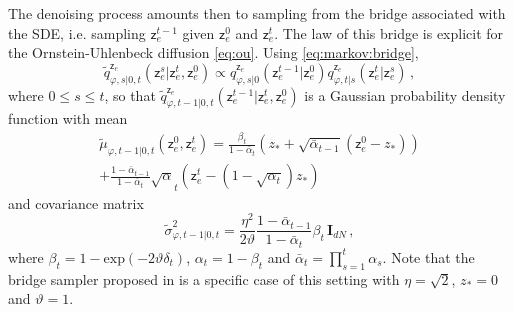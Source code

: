 \documentclass[nohyperref]{article}
\theoremstyle{plain}
\theoremstyle{definition}
\theoremstyle{remark}
\newcommand{\latentcont}{\mathsf{z}_e}
\newcommand{\bckw}{\tilde{q}}
\begin{document}
The denoising process amounts then to sampling from the bridge associated with the SDE, i.e. sampling $\latentcont^{t-1}$ given $\latentcont^0$ and $\latentcont^t$. The law of this bridge is explicit for the Ornstein-Uhlenbeck diffusion \eqref{eq:ou}.
Using \eqref{eq:markov:bridge},
$$
\bckw^{\latentcont}_{\varphi,s|0,t}(\latentcont^{s}|\latentcont^{t},\latentcont^{0}) \propto q^{\latentcont}_{\varphi,s|0}(\latentcont^{t-1}|\latentcont^{0}) q^{\latentcont}_{\varphi,t|s}(\latentcont^{t}|\latentcont^{s})\,,
$$
where $0\leqslant s\leqslant t$, so that $\bckw^{\latentcont}_{\varphi,t-1|0,t}(\latentcont^{t-1}|\latentcont^{t},\latentcont^{0})$ is a Gaussian probability density function with mean
\begin{multline*}
 \tilde \mu_{\varphi,t-1|0,t}(\latentcont^0,\latentcont^t) = \frac{\beta_t}{1-\bar{\alpha}_t}\left(z_* + \sqrt{\bar{\alpha}_{t-1}}(\latentcont^0-z_*)\right)\\  + \frac{1-\bar{\alpha}_{t-1}}{1-\bar{\alpha}_t}\sqrt{\alpha}_t\left(\latentcont^t - (1 - \sqrt{\alpha_t} )z_*\right)
 \end{multline*}
 and covariance matrix
 $$
 \tilde \sigma^2_{\varphi,t-1|0,t} = \frac{\eta^2}{2\vartheta}\frac{1- \bar \alpha_{t-1}}{1- \bar \alpha_{t}}\beta_t\, \mathbf{I}_{dN}\,,
 $$
 where $\beta_t = 1 - \mathrm{exp}(-2\vartheta \delta_t)$, $\alpha_t = 1-\beta_t$ and $\bar{\alpha}_t = \prod_{s=1}^{t}\alpha_s$.
 Note that the bridge sampler proposed in \cite{ho2020denoising} is a specific case of this setting with $\eta = \sqrt{2}$, $z_*=0$ and $\vartheta = 1$. 
\end{document}
